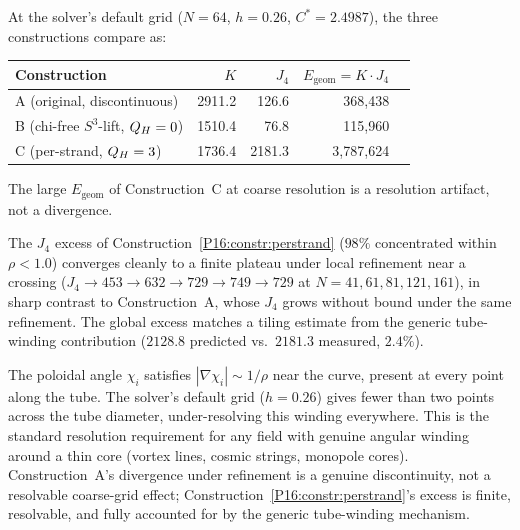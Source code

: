 \begin{proposition}
\label{P16:prop:global_functional_comparison}
At the solver's default grid ($N=64$, $h=0.26$, $C^*=2.4987$), the
three constructions compare as:
\begin{center}
\begin{tabular}{lrrrr}
\toprule
Construction & $K$ & $J_4$ & $E_{\mathrm{geom}}=K\cdot J_4$ \\
\midrule
A (original, discontinuous) & 2911.2 & 126.6 & 368,438 \\
B (chi-free $S^3$-lift, $Q_H=0$) & 1510.4 & 76.8 & 115,960 \\
C (per-strand, $Q_H=3$) & 1736.4 & 2181.3 & 3,787,624 \\
\bottomrule
\end{tabular}
\end{center}
The large $E_{\mathrm{geom}}$ of Construction~C at coarse resolution is
a resolution artifact, not a divergence.
\end{proposition}

\begin{proposition}
\label{P16:prop:j4_resolution_artifact}
The $J_4$ excess of Construction~\ref{P16:constr:perstrand} ($98\%$ concentrated
within $\rho<1.0$) converges cleanly to a finite plateau under local
refinement near a crossing
($J_4\to453\to632\to729\to749\to729$ at $N=41,61,81,121,161$), in sharp
contrast to Construction~A, whose $J_4$ grows without bound under the same
refinement. The global excess matches a tiling estimate from the generic
tube-winding contribution ($2128.8$ predicted vs.\ $2181.3$ measured, $2.4\%$).
\end{proposition}

\begin{remark}
\label{P16:rem:j4_resolution_interpretation}
The poloidal angle $\chi_i$ satisfies $|\nabla\chi_i|\sim1/\rho$ near
the curve, present at every point along the tube. The solver's default
grid ($h=0.26$) gives fewer than two points across the tube diameter,
under-resolving this winding everywhere. This is the standard resolution
requirement for any field with genuine angular winding around a thin core
(vortex lines, cosmic strings, monopole cores). Construction~A's divergence
under refinement is a genuine discontinuity, not a resolvable coarse-grid
effect; Construction~\ref{P16:constr:perstrand}'s excess is finite, resolvable,
and fully accounted for by the generic tube-winding mechanism.
\end{remark}

